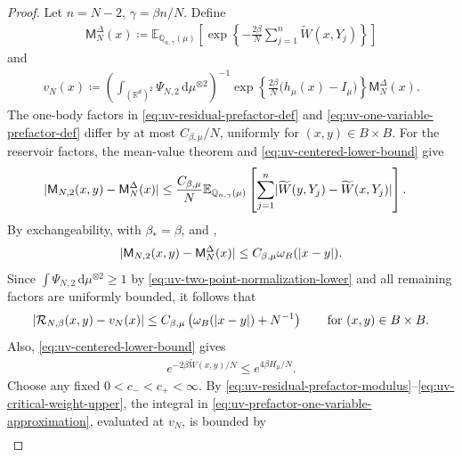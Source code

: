 \documentclass[11pt,reqno]{amsart}
\numberwithin{equation}{section}
\theoremstyle{plain}
\theoremstyle{remark}
\DeclarePairedDelimiter{\abs}{\lvert}{\rvert}
\renewcommand{\d}{\mathsf{d}}
\newcommand{\md}{\mathrm{d}}
\newcommand{\R}{{\mathbb{R}}}
\newcommand{\E}{{\mathbb{E}}}
\newcommand{\Q}{{\mathbb{Q}}}
\newcommand{\tl}{\widetilde}
\newcommand{\be}{\beta}
\begin{document}
\begin{proof}
Let \(n=N-2\), \(\gamma=\be n/N\).  Define
\begin{align}\label{eq:uv-diagonal-reservoir-factor}
 \mathsf M_N^\Delta(x)
 \coloneqq
 \E_{\Q_{n,\gamma}(\mu)}\left[
 \exp\left\{-\frac{2\be}{N}\sum_{j=1}^n\tl W(x,Y_j)\right\}\right]
\end{align}
and
\begin{align}\label{eq:uv-one-variable-prefactor-def}
 v_N(x)
 \coloneqq
 \left(\int_{(\R^\d)^2}\Psi_{N,2}\,\md\mu^{\otimes2}\right)^{-1}
 \exp\left\{\frac{2\be}{N}\bigl(h_\mu(x)-I_\mu\bigr)\right\}
 \mathsf M_N^\Delta(x).
\end{align}
The one-body factors in \eqref{eq:uv-residual-prefactor-def} and \eqref{eq:uv-one-variable-prefactor-def} differ by at most \(C_{\be,\mu}/N\), uniformly for \((x,y)\in B\times B\).  For the reservoir factors, the mean-value theorem and \eqref{eq:uv-centered-lower-bound} give
\begin{align}\label{eq:uv-reservoir-factor-difference}
 \abs{\mathsf M_{N,2}(x,y)-\mathsf M_N^\Delta(x)}
 &\le\frac{C_{\be,\mu}}{N}
 \E_{\Q_{n,\gamma}(\mu)}\left[
 \sum_{j=1}^n
 \abs{\tl W(y,Y_j)-\tl W(x,Y_j)}\right].
\end{align}
By exchangeability,  with \(\be_*=\be\), and ,
\begin{align}\label{eq:uv-reservoir-factor-modulus}
 \abs{\mathsf M_{N,2}(x,y)-\mathsf M_N^\Delta(x)}
 \le C_{\be,\mu}\omega_B(\abs{x-y}).
\end{align}
Since \(\int\Psi_{N,2}\,\md\mu^{\otimes2}\ge1\) by \eqref{eq:uv-two-point-normalization-lower} and all remaining factors are uniformly bounded, it follows that
\begin{align}\label{eq:uv-residual-prefactor-modulus}
 \abs{\mathcal R_{N,\be}(x,y)-v_N(x)}
 \le C_{\be,\mu}\left(\omega_B(\abs{x-y})+N^{-1}\right)
 \qquad\text{for \((x,y)\in B\times B\)}.
\end{align}
Also, \eqref{eq:uv-centered-lower-bound} gives
\begin{align}\label{eq:uv-critical-weight-upper}
 e^{-2\be\tl W(x,y)/N}\le e^{4\be H_\mu/N}.
\end{align}
Choose any fixed \(0<c_-<c_+<\infty\).  By \eqref{eq:uv-residual-prefactor-modulus}--\eqref{eq:uv-critical-weight-upper}, the integral in \eqref{eq:uv-prefactor-one-variable-approximation}, evaluated at \(v_N\), is bounded by
\begin{align}\label{eq:uv-prefactor-error-integral}

\end{align}
\end{proof}
\end{document}
